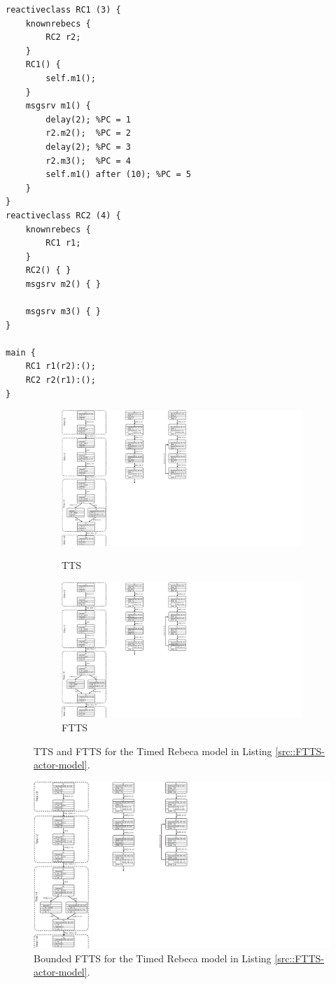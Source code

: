 
\begin{lstlisting}[language=rebeca, caption= A simple Timed Rebeca model with two rebecs, label=src::FTTS-actor-model]
reactiveclass RC1 (3) {
	knownrebecs {
		RC2 r2;
	}
	RC1() {
		self.m1();
	}
	msgsrv m1() {
		delay(2); %PC = 1
		r2.m2();  %PC = 2 
		delay(2); %PC = 3 
		r2.m3();  %PC = 4
		self.m1() after (10); %PC = 5
	}
}
reactiveclass RC2 (4) {
	knownrebecs {
		RC1 r1;
	}
	RC2() { }
	msgsrv m2() { }
	
	msgsrv m3() { }
}

main {
	RC1 r1(r2):();
	RC2 r2(r1):();
}

\end{lstlisting}

\begin{figure}
\centering
\begin{subfigure}[b]{0.34\textwidth}
  \centering
  \small{
   \includegraphics[width=.8\textwidth]{resources/TTS.pdf}
  }
  \caption{TTS}
  \label{fig::TTS}
\end{subfigure}
\begin{subfigure}[b]{0.14\textwidth}
  \centering
  \small{
   \includegraphics[width=.8\textwidth]{resources/FTTS.pdf}
   \caption{FTTS}
   \label{fig::FTTS}
  }
\end{subfigure}
\caption{ TTS and FTTS for the Timed Rebeca model in Listing \ref{src::FTTS-actor-model}.}
\label{fig::FTTSandTTS}
\end{figure}

\begin{figure}
\centering
\includegraphics[width=.15\textwidth]{resources/BFTTS.pdf}
\caption{ Bounded FTTS for the Timed Rebeca model in Listing \ref{src::FTTS-actor-model}.}
\label{fig::BFTTS}
\end{figure}
